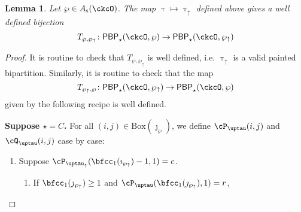 \documentclass[12pt,a4paper]{amsart}
\def\ttau{\tilde{\tau}}
\numberwithin{equation}{section}
\newtheorem{lem}[thm]{Lemma}
\theoremstyle{remark}
\def\BOX#1{\mathrm{Box}(#1)}
\def\PBP{\mathsf{PBP}}
\def\PBPop#1#2#3#4{\PBP_{#1}^{#2}(#3,#4)}
\newcommand{\PBPOP}[1][]{\PBPop{\star}{#1}{\ckcO}{\wp}}
\def\Ass{A_{\mathrm{s}}}
\def\wpu{\wp_{\uparrow}}
\def\wpd{\wp} %
\def\uptauu{\uptau_{\uparrow}}
\def\uptaud{\uptau} %
\begin{document}

\begin{lem}\label{lem:sn}
  Let $\wp\in \Ass(\ckcO)$. The map $\uptau\mapsto \uptauu$ defined above
  gives a well defined
  bijection
  \[
    T_{\wp,\wpu}\colon \PBPOP \rightarrow
    \PBPop{\star}{}{\ckcO}{\wpu} %
  \]
\end{lem}
\begin{proof}
  It is routine to check that $T_{\wp,\wpu}$ is well defined, i.e. $\uptauu$ is a valid painted bipartition.
  Similarly, it is routine to check that the map
  \[
    T_{\wpu,\wp}\colon
    \PBPop{\star}{}{\ckcO}{\wpu} \rightarrow \PBPOP
  \]
  given by the following recipe is well defined.

  {\bfseries Suppose $\star = C$.}
  For all $(i,j)\in \BOX{\jmath_{\wpd}}$, we define $\cP_{\uptaud}(i,j)$ and $\cQ_{\uptaud}(i,j)$ case by
  case:
 \begin{enumerate}[label=(\alph*)]
   \item Suppose
   $\cP_{\uptauu}(\bfcc_{1}(\imath_{\wpu})-1,1)=c$.
   \begin{enumerate}[label={\localtextbulletone}]
     \item
           If $\bfcc_{1}(\jmath_{\wpu})\geq 1$ and
           $\cP_{\uptau}(\bfcc_{1}(\jmath_{\wpu}),1) = r$,


\end{enumerate}
\end{enumerate}
\end{proof}
\end{document}
